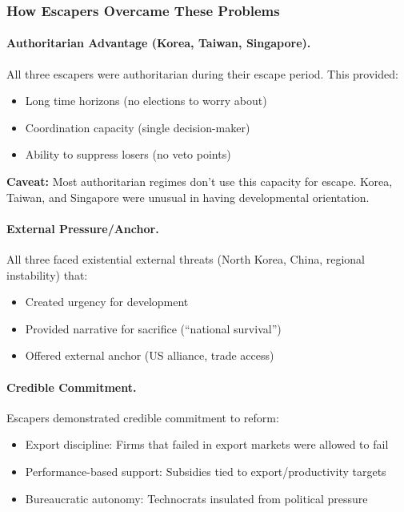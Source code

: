 \subsubsection{How Escapers Overcame These Problems}

\paragraph{Authoritarian Advantage (Korea, Taiwan, Singapore).}
All three escapers were authoritarian during their escape period. This 
provided:
\begin{itemize}
    \item Long time horizons (no elections to worry about)
    \item Coordination capacity (single decision-maker)
    \item Ability to suppress losers (no veto points)
\end{itemize}

\textbf{Caveat:} Most authoritarian regimes don't use this capacity for escape.
Korea, Taiwan, and Singapore were unusual in having developmental orientation.

\paragraph{External Pressure/Anchor.}
All three faced existential external threats (North Korea, China, regional 
instability) that:
\begin{itemize}
    \item Created urgency for development
    \item Provided narrative for sacrifice (``national survival'')
    \item Offered external anchor (US alliance, trade access)
\end{itemize}

\paragraph{Credible Commitment.}
Escapers demonstrated credible commitment to reform:
\begin{itemize}
    \item Export discipline: Firms that failed in export markets were allowed to fail
    \item Performance-based support: Subsidies tied to export/productivity targets
    \item Bureaucratic autonomy: Technocrats insulated from political pressure
\end{itemize}

